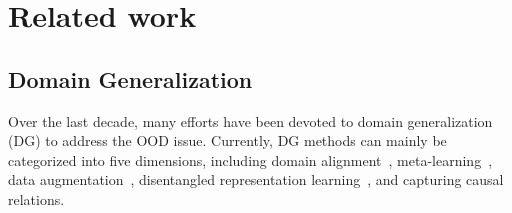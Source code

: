 \section{Related work}
\subsection{Domain Generalization}
Over the last decade, many efforts have been devoted to domain generalization (DG) to address the OOD issue. 
Currently, DG methods can mainly be categorized into five dimensions, including domain alignment~\cite{ganin2016domain, cheng2024disentangled}, meta-learning~\cite{dou2019domain, wang2020meta, zhang2021adaptive}, data augmentation~\cite{carlucci2019domain, shankar2018generalizing}, disentangled representation learning~\cite{khosla2012undoing, peng2019domain}, and capturing causal relations. 
